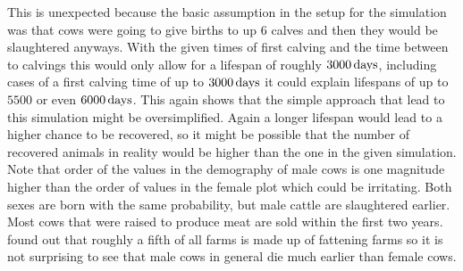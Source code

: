 This is unexpected because the basic assumption in the setup for the simulation was that cows were going to give births to up 6 calves and then they would be slaughtered anyways. With the given times of first calving and the time between to calvings this would only allow for a lifespan of roughly $3000\,\text{days}$, including cases of a first calving time of up to $3000\,\text{days}$ it could explain lifespans of up to $5500$ or even $6000\,\text{days}$. This again shows that the simple approach that lead to this simulation might be oversimplified. Again a longer lifespan would lead to a higher chance to be recovered, so it might be possible that the number of recovered animals in reality would be higher than the one in the given simulation. 
Note that order of the values in the demography of male cows is one magnitude higher than the order of values in the female plot which could be irritating. Both sexes are born with the same probability, but male cattle are slaughtered earlier. Most cows that were raised to produce meat are sold within the first two years. \citep{steinbach16} found out that roughly a fifth of all farms is made up of fattening farms so it is not surprising to see that male cows in general die much earlier than female cows.
